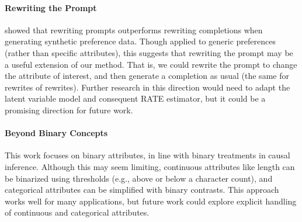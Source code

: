 \documentclass{article}
\begin{document}
\paragraph{Rewriting the Prompt} \citet{wang2024selftaughtevaluators} showed that rewriting prompts outperforms rewriting completions when generating synthetic preference data. Though applied to generic preferences (rather than specific attributes), this suggests that rewriting the prompt may be a useful extension of our method. That is, we could rewrite the prompt to change the attribute of interest, and then generate a completion as usual (the same for rewrites of rewrites). Further research in this direction would need to adapt the latent variable model and consequent RATE estimator, but it could be a promising direction for future work.

\paragraph{Beyond Binary Concepts}
This work focuses on binary attributes, in line with binary treatments in causal inference. Although this may seem limiting, continuous attributes like length can be binarized using thresholds (e.g., above or below a character count), and categorical attributes can be simplified with binary contrasts. This approach works well for many applications, but future work could explore explicit handling of continuous and categorical attributes.




\appendix
\end{document}
